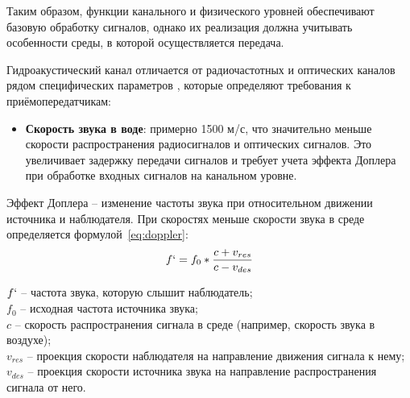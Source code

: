 \documentclass[
    numbers=section,
    document-code={ВКРБ--09.03.04--10.19--XX--26--81}
]{../latex/fqw}
\begin{document}
    Таким образом, функции канального и физического уровней обеспечивают базовую обработку сигналов,
    однако их реализация должна учитывать особенности среды, в которой осуществляется передача.

    Гидроакустический канал отличается от радиочастотных и оптических каналов рядом специфических параметров
    \nbspace\cite[гл.~1]{urikOsnovyGidroakustiki1978}, %
    которые определяют требования к приёмопередатчикам:

    \begin{itemize}
        \item \textbf{Скорость звука в воде}:
        примерно 1500 м/с, что значительно меньше скорости распространения радиосигналов и оптических сигналов.
        Это увеличивает задержку передачи сигналов и требует учета эффекта Доплера
        при обработке входных сигналов на канальном уровне.
    \end{itemize}

    Эффект Доплера -- изменение частоты звука при относительном движении
    источника и наблюдателя. При скоростях меньше скорости звука в среде
    определяется формулой~\ref{eq:doppler}:
    \begin{equation}
        f` = f_{0}*\frac{c + v_{res}}{c - v_{des}}
        \label{eq:doppler}
    \end{equation}
    \begin{FqwWhere}
        \(f`\) -- частота звука, которую слышит наблюдатель;\\
        \(f_{0}\) -- исходная частота источника звука;\\
        \(c\) -- скорость распространения сигнала в среде (например, скорость звука в воздухе);\\
        \(v_{res}\) -- проекция скорости наблюдателя на направление движения сигнала к нему;\\
        \(v_{des}\) -- проекция скорости источника звука на направление распространения сигнала от него.\\
    \end{FqwWhere}
\end{document}

